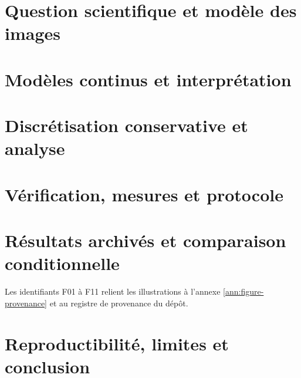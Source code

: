 \documentclass[11pt,a4paper,oneside]{report}
\begin{document}
\chapter{Question scientifique et modèle des images}


\chapter{Modèles continus et interprétation}


\chapter{Discrétisation conservative et analyse}


\chapter{Vérification, mesures et protocole}



\chapter{Résultats archivés et comparaison conditionnelle}
Les identifiants F01 à F11 relient les illustrations à l'annexe
\ref{ann:figure-provenance} et au registre de provenance du dépôt.

\chapter{Reproductibilité, limites et conclusion}



\clearpage
{}
{}


\appendix


\end{document}
